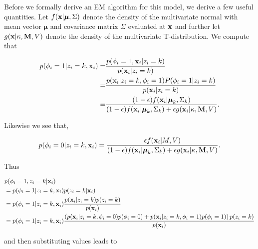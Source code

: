 \documentclass[12pt,english]{article}\usepackage[]{graphicx}\usepackage[]{color}
\begin{document}
Before we formally derive an EM algorithm for this model, we derive a
few useful quantities. Let $f({\bf x} | \boldsymbol{\mu}, \Sigma)$
denote the density of the multivariate normal with mean vector
$\boldsymbol{\mu}$ and covariance matrix $\Sigma$ evaluated at
${\bf x}$ and further let $g({\bf x} | \kappa, {\bf M}, V )$ denote
the density of the multivariate T-distribution. We compute that

\begin{equation}
\begin{split}
p(\phi_i = 1|z_i = k , {\bf x}_i ) = &\frac{p(\phi_i=1, {\bf x}_i|z_i = k)}{p({\bf x}_i|z_i = k)}\\
=  & \frac{p({\bf x}_i|z_i = k, \phi_i =1)P(\phi_i=1|z_i= k)}{p({\bf x}_i|z_i = k)}\\
=  &\frac{(1-\epsilon)f({\bf x}_i|\boldsymbol{\mu}_k, \Sigma_{k})}{(1-\epsilon) f({\bf x}_i|\boldsymbol{\mu}_k, \Sigma_k) + \epsilon g({\bf x}_i|\kappa, {\bf M}, V)}.
\end{split}
\end{equation}

Likewise we see that,

\begin{equation}
\begin{split}
p(\phi_i = 0|z_i = k , {\bf x}_i ) = \frac{\epsilon f({\bf x}_i|M, V)}{(1-\epsilon) f({\bf x}_i|\boldsymbol{\mu}_k, \Sigma_k) + \epsilon g({\bf x}_i|\kappa, {\bf M}, V)}.
\end{split}
\end{equation}

Thus

\begin{equation}
\begin{split}
& p(\phi_i = 1, z_i = k| {\bf x}_i ) \\
& = p(\phi_i = 1|z_i = k, {\bf x}_i)p(z_i = k|{\bf x}_i)\\
& = p(\phi_i = 1|z_i = k, {\bf x}_i)\frac{p({\bf x}_i|z_i = k)p(z_i = k)}{p({\bf x}_i)}\\
& = p(\phi_i = 1|z_i = k, {\bf x}_i)\frac{\left(p({\bf x}_i|z_i = k,\phi_i =0)p(\phi_i=0) + p({\bf x}_i|z_i = k,\phi_i =1)p(\phi_i=1) \right)p(z_i = k)}{p({\bf x}_i)}\\
\end{split}
\end{equation}

and then substituting values leads to
\end{document}

